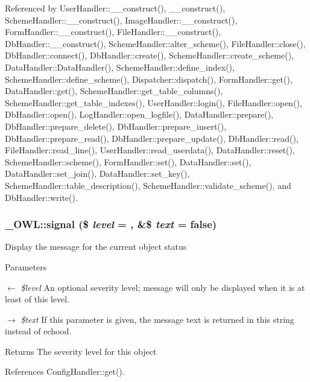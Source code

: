 Referenced by UserHandler::\_\-\_\-construct(), \_\-\_\-construct(), SchemeHandler::\_\-\_\-construct(), ImageHandler::\_\-\_\-construct(), FormHandler::\_\-\_\-construct(), FileHandler::\_\-\_\-construct(), DbHandler::\_\-\_\-construct(), SchemeHandler::alter\_\-scheme(), FileHandler::close(), DbHandler::connect(), DbHandler::create(), SchemeHandler::create\_\-scheme(), DataHandler::DataHandler(), SchemeHandler::define\_\-index(), SchemeHandler::define\_\-scheme(), Dispatcher::dispatch(), FormHandler::get(), DataHandler::get(), SchemeHandler::get\_\-table\_\-columns(), SchemeHandler::get\_\-table\_\-indexes(), UserHandler::login(), FileHandler::open(), DbHandler::open(), LogHandler::open\_\-logfile(), DataHandler::prepare(), DbHandler::prepare\_\-delete(), DbHandler::prepare\_\-insert(), DbHandler::prepare\_\-read(), DbHandler::prepare\_\-update(), DbHandler::read(), FileHandler::read\_\-line(), UserHandler::read\_\-userdata(), DataHandler::reset(), SchemeHandler::scheme(), FormHandler::set(), DataHandler::set(), DataHandler::set\_\-join(), DataHandler::set\_\-key(), SchemeHandler::table\_\-description(), SchemeHandler::validate\_\-scheme(), and DbHandler::write().

\subsubsection[{signal}]{\setlength{\rightskip}{0pt plus 5cm}\_\-OWL::signal (\$ {\em level} = {}, \/  \&\$ {\em text} = {\ttfamily false})}\label{class__OWL_a51ba4a16409acf2a2f61f286939091a5}
Display the message for the current object status


\begin{DoxyParams}{Parameters}
\item[\mbox{$\leftarrow$} {\em \$level}]An optional severity level; message will only be displayed when it is at least of this level. \item[\mbox{$\rightarrow$} {\em \$text}]If this parameter is given, the message text is returned in this string instead of echood. \end{DoxyParams}
\begin{DoxyReturn}{Returns}
The severity level for this object 
\end{DoxyReturn}


References ConfigHandler::get().



